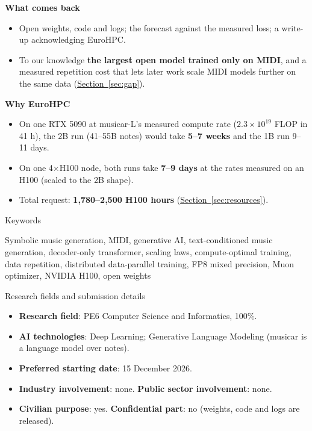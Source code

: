 \documentclass[11pt,a4paper]{article}
\makeatletter
\newcommand{\seclink}[2]{\hyperref[#1]{\textcolor{blue!60!black}{\underline{#2}}}}
\renewcommand\subsection{\@startsection{subsection}{2}{\z@}{-2.6ex \@plus -1ex \@minus -.2ex}{1.2ex \@plus .2ex}%
  {\normalfont\large\bfseries\color{head}}}
\makeatother
\begin{document}
\medskip
\textbf{What comes back}
\begin{itemize}
\item Open weights, code and logs; the forecast against the measured loss; a write-up acknowledging EuroHPC.
\item To our knowledge \textbf{the largest open model trained only on MIDI}, and a measured repetition cost that lets
later work scale MIDI models further on the same data (\seclink{sec:gap}{Section~\ref*{sec:gap}}).
\end{itemize}

\medskip
\textbf{Why EuroHPC}
\begin{itemize}
\item On one RTX 5090 at musicar-L's measured compute rate ($2.3\times10^{19}$ FLOP in 41 h), the 2B run (41--55B notes) would take \textbf{5--7 weeks}
and the 1B run 9--11 days.
\item On one 4$\times$H100 node, both runs take \textbf{7--9 days} at the rates measured on an H100 (scaled to the 2B shape).
\item Total request: \textbf{1,780--2,500 H100 hours}
(\seclink{sec:resources}{Section~\ref*{sec:resources}}).
\end{itemize}

\subsection{Keywords}

\noindent Symbolic music generation, MIDI, generative AI, text-conditioned music generation, decoder-only
transformer, scaling laws, compute-optimal training, data repetition, distributed data-parallel training, FP8 mixed
precision, Muon optimizer, NVIDIA H100, open weights

\subsection{Research fields and submission details}

\begin{itemize}
\item \textbf{Research field}: PE6 Computer Science and Informatics, 100\%.
\item \textbf{AI technologies}: Deep Learning; Generative Language Modeling (musicar is a language model over notes).
\item \textbf{Preferred starting date}: 15 December 2026.
\item \textbf{Industry involvement}: none. \textbf{Public sector involvement}: none.
\item \textbf{Civilian purpose}: yes. \textbf{Confidential part}: no (weights, code and logs are released).
\end{itemize}
\end{document}
